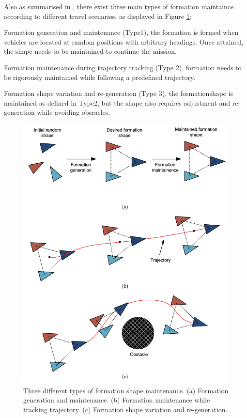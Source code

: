 \documentclass[letterpaper,12pt]{article}
\begin{document}
Also as summarised in \cite{liu_bucknall_2018}, there exist three main types of formation maintaince according to different travel scenarios, as displayed in Figure \ref{fig:3typesformationmaintenance}:

\begin{compactenum}
	\item Formation generation and maintenance (Type1), the formation is formed when vehicles are located at random positions with arbitrary headings. Once attained, the shape needs to be maintained to continue the mission.
	\item Formation maintenance during trajectory tracking (Type 2), formation needs to be rigorously maintained while following a predefined trajectory.
	\item Formation shape variation and re-generation (Type 3), the formationshape is maintained as defined in Type2, but the shape also requires adjustment and re-generation while avoiding obsracles.
\end{compactenum}

\begin{figure}
	\centering
	\includegraphics[width=5in]{3typesformationmaintenance.png}
	\caption{Three different types of formation shape maintenance. (a) Formation generation and maintenance. (b) Formation maintenance while tracking trajectory. (c) Formation shape variation and re-generation.}
	\label{fig:3typesformationmaintenance} 
\end{figure}
\end{document}
